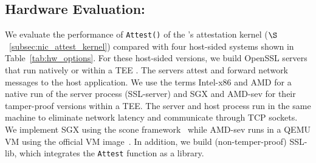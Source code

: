 

\subsection{Hardware Evaluation: \trustedfpga{}}
\label{subsec:hw_eval}




We evaluate the performance of {\tt Attest()} of the \projecttitle{}'s attestation kernel  ($\S$~\ref{subsec:nic_attest_kernel}) compared with four host-sided systems shown in Table~\ref{tab:hw_options}. For these host-sided versions, we build OpenSSL  servers that run natively or within a TEE . The servers attest and forward network messages to the host application. We use the terms Intel-x86 and AMD for a native run of the server process (SSL-server) and SGX and AMD-sev for their tamper-proof versions within a TEE. 
The server and host process run in the same machine to eliminate network latency and communicate through TCP sockets. We implement SGX using the {\sc scone} framework~\cite{scone} while AMD-sev runs in a QEMU VM using the official VM image~\cite{AMDSEV}. In addition, we build (non-temper-proof) SSL-lib, which integrates the {\tt Attest} function as a library. 

